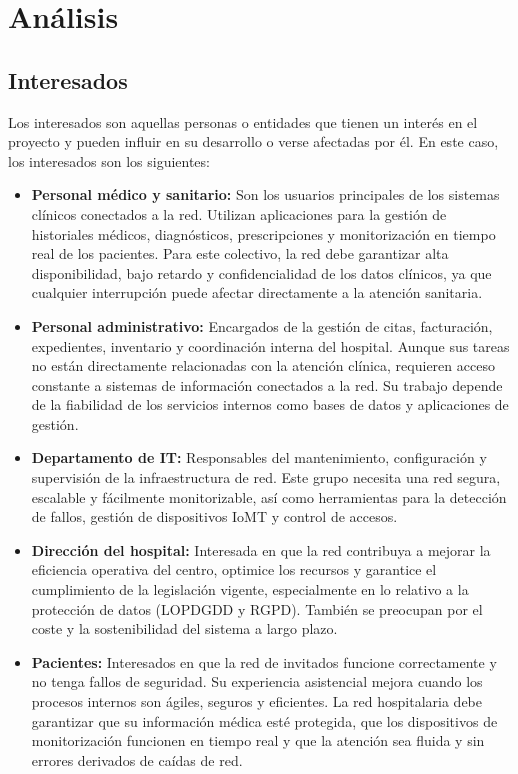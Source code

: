 
\chapter{Análisis }\label{análisis}

\section{Interesados}
Los interesados son aquellas personas o entidades que tienen un interés en el proyecto y pueden influir en su desarrollo o verse afectadas por él. En este caso, 
los interesados son los siguientes:

\begin{itemize}
    \item \textbf{Personal médico y sanitario:} Son los usuarios principales de los sistemas clínicos conectados a la red. Utilizan aplicaciones para la gestión de 
    historiales médicos, diagnósticos, prescripciones y monitorización en tiempo real de los pacientes. Para este colectivo, la red debe garantizar alta disponibilidad, 
    bajo retardo y confidencialidad de los datos clínicos, ya que cualquier interrupción puede afectar directamente a la atención sanitaria.
    \item \textbf{Personal administrativo:} Encargados de la gestión de citas, facturación, expedientes, inventario y coordinación interna del hospital. Aunque sus tareas 
    no están directamente relacionadas con la atención clínica, requieren acceso constante a sistemas de información conectados a la red. Su trabajo depende de la fiabilidad 
    de los servicios internos como bases de datos y aplicaciones de gestión.
    \item \textbf{Departamento de \acs{IT}:} Responsables del mantenimiento, configuración y supervisión de la infraestructura de red. Este grupo necesita una red segura, escalable 
    y fácilmente monitorizable, así como herramientas para la detección de fallos, gestión de dispositivos IoMT y control de accesos.
    \item \textbf{Dirección del hospital:} Interesada en que la red contribuya a mejorar la eficiencia operativa del centro, optimice los recursos y garantice el cumplimiento 
    de la legislación vigente, especialmente en lo relativo a la protección de datos (\acs{LOPDGDD} y \acs{RGPD}). También se preocupan por el coste y la sostenibilidad del sistema a 
    largo plazo.
    \item \textbf{Pacientes:} Interesados en que la red de invitados funcione correctamente y no tenga fallos de seguridad. Su experiencia asistencial mejora cuando los 
    procesos internos son ágiles, seguros y eficientes. La red hospitalaria debe garantizar que su información médica esté protegida, que los dispositivos de monitorización 
    funcionen en tiempo real y que la atención sea fluida y sin errores derivados de caídas de red.
\end{itemize}


